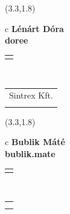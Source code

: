 \documentclass[11pt]{article}
\begin{document}
\makebox(3.3,1.8){
  \renewcommand\arraystretch{1.3}
  \begin{tabular}[c]{c}
    \hspace{8.5mm}
    \LARGE\bf{ Lénárt Dóra }\\
    \hspace{8.5mm}
    \Large{ doree }\\
    \renewcommand\arraystretch{3}
    \begin{tabular}[c]{c}
      \centering
      \fontfamily{phv}\selectfont{
        \textbf{
          \textsc{
            \scriptsize{
            \color{Bright}{ Ismerkedő }\color{Dark}{ Webmester }\color{Bright}{ Sminkmester }\color{Bright}{ Programozó }
            }
          }
        }
      }
    \end{tabular}
    \\
    \renewcommand\arraystretch{1}
    \begin{tabular}{p{3.3in}}
      \hspace{.7cm}Sintrex Kft.\\
      \hspace{.7cm}\emph{  }\\
    \end{tabular}
  \end{tabular}
}

\makebox(3.3,1.8){
  \renewcommand\arraystretch{1.3}
  \begin{tabular}[c]{c}
    \hspace{8.5mm}
    \LARGE\bf{ Bublik Máté }\\
    \hspace{8.5mm}
    \Large{ bublik.mate }\\
    \renewcommand\arraystretch{3}
    \begin{tabular}[c]{c}
      \centering
      \fontfamily{phv}\selectfont{
        \textbf{
          \textsc{
            \scriptsize{
            \color{Bright}{ Ismerkedő }\color{Dark}{ Webmester }\color{Dark}{ Sminkmester }\color{Bright}{ Programozó }
            }
          }
        }
      }
    \end{tabular}
    \\
    \renewcommand\arraystretch{1}
    \begin{tabular}{p{3.3in}}
      \hspace{.7cm}\\
      \hspace{.7cm}\emph{  }\\
    \end{tabular}
  \end{tabular}
}
\end{document}
